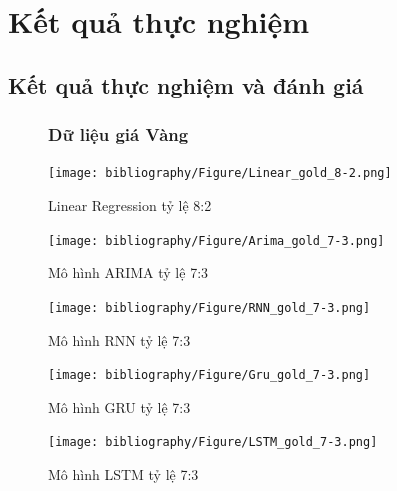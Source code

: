 \documentclass[conference]{IEEEtran}
\begin{document}
\section{Kết quả thực nghiệm}

\subsection{Kết quả thực nghiệm và đánh giá}
\begin{figure}[t] 
\subsubsection{Dữ liệu giá Vàng}
    \raggedright
    \begin{minipage}{0.5\textwidth}
        \centering
        \begin{minipage}{0.45\textwidth}
            \centering
            \texttt{[image: bibliography/Figure/Linear\_gold\_8-2.png]}
            \caption{Linear Regression tỷ lệ 8:2}
        \end{minipage}
        \hfill
        \begin{minipage}{0.45\textwidth}
            \centering
            \texttt{[image: bibliography/Figure/Arima\_gold\_7-3.png]}
            \caption{Mô hình ARIMA tỷ lệ 7:3}
        \end{minipage}
        \hfill
        \begin{minipage}{0.45\textwidth}
            \centering
            \texttt{[image: bibliography/Figure/RNN\_gold\_7-3.png]}
            \caption{Mô hình RNN tỷ lệ 7:3}
        \end{minipage}
        \hfill
        \begin{minipage}{0.45\textwidth}
            \centering
            \texttt{[image: bibliography/Figure/Gru\_gold\_7-3.png]} 
            \caption{Mô hình GRU tỷ lệ 7:3}
        \end{minipage}
        \hfill
        \begin{minipage}{0.45\textwidth}
            \centering
            \texttt{[image: bibliography/Figure/LSTM\_gold\_7-3.png]} 
            \caption{Mô hình LSTM tỷ lệ 7:3}
        \end{minipage}
        \hfill
        \begin{minipage}{0.45\textwidth}
            \centering

\end{minipage}
\end{minipage}
\end{figure}
\end{document}
